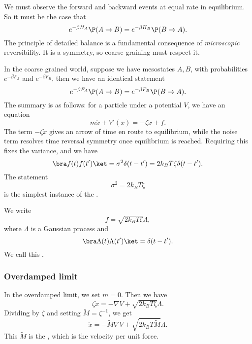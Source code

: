 \documentclass[a4paper]{article}
\begin{document}
We must observe the forward and backward events at equal rate in equilibrium. So it must be the case that
\[
  e^{-\beta H_A} \P(A \to B) = e^{-\beta H_B} \P(B \to A).
\]
The principle of detailed balance is a fundamental consequence of \emph{microscopic} reversibility. It is a symmetry, so coarse graining must respect it.

In the coarse grained world, suppose we have mesostates $A, B$, with probabilities $e^{-\beta F_A}$ and $e^{-\beta F_B}$, then we have an identical statement
\[
  e^{-\beta F_A} \P(A \to B) = e^{-\beta F_B} \P(B \to A).
\]
The summary is as follows: for a particle under a potential $V$, we have an equation
\[
  m\ddot{x} + V'(x) = - \zeta \dot{x} + f.
\]
The term $-\zeta \dot{x}$ gives an arrow of time en route to equilibrium, while the noise term resolves time reversal symmetry once equilibrium is reached. Requiring this fixes the variance, and we have
\[
  \bra f(t) f(t')\ket = \sigma^2 \delta(t - t') = 2 k_B T \zeta \delta(t - t').
\]
The statement
\[
  \sigma^2 = 2 k_B T \zeta
\]
is the simplest instance of the .

We write
\[
  f = \sqrt{2k_B T \zeta} \Lambda,
\]
where $\Lambda$ is a Gaussian process and
\[
  \bra \Lambda(t) \Lambda(t')\ket = \delta(t - t').
\]
We call this .

\subsubsection*{Overdamped limit}
In the overdamped limit, we set $m = 0$. Then we have
\[
  \zeta \dot{x} = - \nabla V + \sqrt{2k_B T \zeta} \Lambda.
\]
Dividing by $\zeta$ and setting $\tilde{M} = \zeta^{-1}$, we get
\[
  \dot{x} = - \tilde{M} \nabla V + \sqrt{2k_B T \tilde{M}} \Lambda.
\]
This $\tilde{M}$ is the , which is the velocity per unit force.
\end{document}

